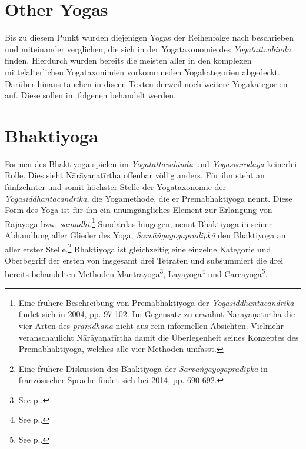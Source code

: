\section{Other Yogas}

Bis zu diesem Punkt wurden diejenigen Yogas der Reihenfolge nach beschrieben und miteinander verglichen, die sich in der Yogataxonomie des \textit{Yogatattvabindu} finden. Hierdurch wurden bereits die meisten aller in den komplexen mittelalterlichen Yogataxonimien vorkommneden Yogakategorien abgedeckt. Darüber hinaus tauchen in diseen Texten derweil noch weitere Yogakategorien auf. Diese sollen im folgenen behandelt werden.   

\section{Bhaktiyoga}

Formen des Bhaktiyoga spielen im \textit{Yogatattavabindu} und \textit{Yogasvarodaya} keinerlei Rolle. Dies sieht Nārāyaṇatīrtha offenbar völlig anders. Für ihn steht an fünfzehnter und somit höchster Stelle der Yogataxonomie der \textit{Yogasiddhāntacandrikā}, die Yogamethode, die er Premabhaktiyoga nennt. Diese Form des Yoga ist für ihn ein unumgängliches Element zur Erlangung von Rājayoga bzw. \textit{samādhi}.\footnote{Eine frühere Beschreibung von Premabhaktiyoga der \textit{Yogasiddhāntacandrikā} findet sich in \citeauthor{penna2004} 2004, pp. 97-102. Im Gegensatz zu \citeauthor{penna2004} erwähnt Nārayaṇatīrtha die vier Arten des \textit{prāṇidhāna} nicht aus rein informellen Absichten. Vielmehr veranschaulicht Nārāyaṇatīrtha damit die Überlegenheit seines Konzeptes des Premabhaktiyoga, welches alle vier Methoden umfasst.} Sundardās hingegen, nennt Bhaktiyoga in seiner Abhandlung aller Glieder des Yoga, \textit{Sarvāṅgayogapradipkā} den Bhaktiyoga an aller erster Stelle.\footnote{Eine frühere Diskussion des Bhaktiyoga der \textit{Sarvāṅgayogapradipkā} in französischer Sprache findet sich bei \citeauthor{burger2014sarvangayogapradipika} 2014, pp. 690-692.} Bhaktiyoga ist gleichzeitig eine einzelne Kategorie und Oberbegriff der ersten von insgesamt drei Tetraten und subsummiert die drei bereits behandelten Methoden Mantrayoga\footnote{See p.\pageref{mantrayogaintrosarva}.}, Layayoga\footnote{See p.\pageref{layaintrosarvanga}.} und Carcāyoga\footnote{See p.\pageref{carcasarvanga}.}.    


